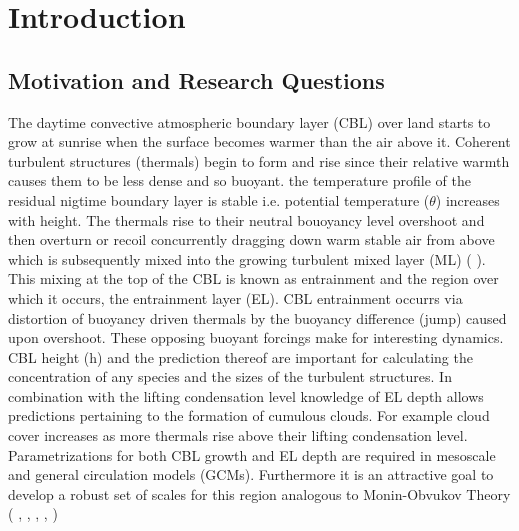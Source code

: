 
\chapter{Introduction} 
\label{ch:Introduction}
\setlength{\parindent}{0cm}

\section{Motivation and Research Questions}
\label{sec:Mot}
The daytime convective atmospheric boundary layer (\acs{CBL}) over land starts to grow at sunrise when the surface becomes warmer than the air above it.  Coherent turbulent structures (thermals) begin to form and rise since their relative warmth causes them to be less dense and so buoyant.  the temperature profile of the residual nigtime boundary layer is stable i.e. potential temperature ($\theta$) increases with height.  The thermals rise to their neutral bouoyancy level overshoot and then overturn or recoil concurrently dragging down warm stable air from above which is subsequently mixed into the growing turbulent mixed layer (\acs{ML}) (\citeauthor{Stull-BLMetIntro} \citeyear{Stull-BLMetIntro}).  This mixing at the top of the \acs{CBL} is known as entrainment and the region over which it occurs, the entrainment layer (\acs{EL}).  \acs{CBL} entrainment occurrs via distortion of buoyancy driven thermals by the buoyancy difference (jump) caused upon overshoot.  These opposing buoyant forcings make for interesting dynamics.\\

\acs{CBL} height (h) and the prediction thereof are important for calculating the concentration of any species and the sizes of the turbulent structures.  In combination with the lifting condensation level knowledge of \acs{EL} depth allows predictions pertaining to the formation of cumulous clouds.  For example cloud cover increases as more thermals rise above their lifting condensation level.  Parametrizations for both \acs{CBL} growth and \acs{EL} depth are required in mesoscale and general circulation models (\acs{GCM}s).  Furthermore it is an attractive goal to develop a robust set of scales for this region analogous to Monin-Obvukov Theory (\citeauthor{Stull-BLMetIntro} \citeyear{Stull-BLMetIntro}, \citeauthor{Traum11} \citeyear{Traum11}, \citeauthor{SteynBaldHoff} \citeyear{SteynBaldHoff}, \citeauthor{StullNelEl} \citeyear{StullNelEl}, \citeauthor{Sorbjan} \citeyear{Sorbjan})\\

